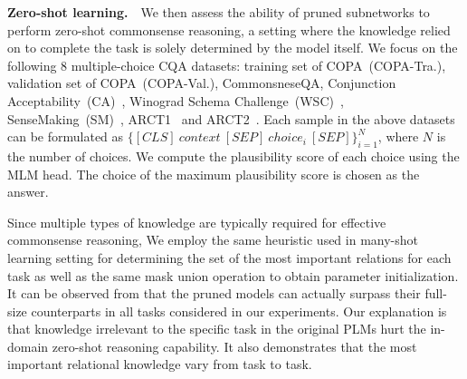 \textbf{Zero-shot learning.}~~We then assess the ability of pruned 
subnetworks to perform zero-shot commonsense reasoning, a setting where 
the knowledge relied on to complete the task is solely determined by the model 
itself. We focus on the following 8 multiple-choice CQA datasets: training set of COPA~(COPA-Tra.), validation set of COPA~(COPA-Val.), CommonsneseQA, Conjunction 
Acceptability~(CA)~\citep{eciplm}, 
Winograd Schema Challenge~(WSC)~\citep{levesque_winograd_2012}, 
SenseMaking~(SM)~\citep{wang-etal-2019-make}, 
ARCT1~\citep{habernal-etal-2018-argument} and 
ARCT2~\citep{DBLP:journals/corr/abs-1907-07355}. Each sample in the above datasets can be formulated as $\{[CLS]~context~[SEP]~choice_i ~[SEP]\}_{i=1}^{N}$, where $N$ is the number of choices. We compute the plausibility score of each choice using the MLM head. The choice of the maximum plausibility score is chosen as the answer. 

Since multiple types of knowledge are typically required for effective commonsense reasoning, 
We employ the same heuristic used in many-shot learning setting for determining the set of 
the most important relations for each task as well as the same mask union operation to 
obtain parameter initialization. 
It can be observed from  that the pruned models can actually surpass their full-size
counterparts in all tasks considered in our experiments. 
Our explanation is that knowledge irrelevant to the specific task 
in the original PLMs hurt the in-domain zero-shot reasoning capability. 
It also demonstrates that the most important relational knowledge vary from 
task to task.
